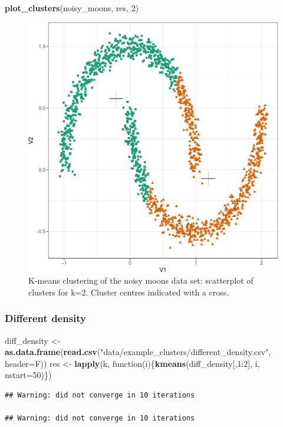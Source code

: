 \documentclass[]{book}
\newenvironment{Shaded}{\begin{snugshade}}{\end{snugshade}}
\newcommand{\KeywordTok}[1]{\textcolor[rgb]{0.13,0.29,0.53}{\textbf{{#1}}}}
\newcommand{\DataTypeTok}[1]{\textcolor[rgb]{0.13,0.29,0.53}{{#1}}}
\newcommand{\DecValTok}[1]{\textcolor[rgb]{0.00,0.00,0.81}{{#1}}}
\newcommand{\StringTok}[1]{\textcolor[rgb]{0.31,0.60,0.02}{{#1}}}
\newcommand{\NormalTok}[1]{{#1}}
\theoremstyle{definition}
\theoremstyle{definition}
\theoremstyle{definition}
\theoremstyle{remark}
\begin{document}
\begin{Shaded}
\begin{Highlighting}[]
\KeywordTok{plot_clusters}\NormalTok{(noisy_moons, res, }\DecValTok{2}\NormalTok{)}
\end{Highlighting}
\end{Shaded}

\begin{figure}

{\centering \includegraphics[width=0.5\linewidth]{09-clustering_files/figure-latex/kmeansNoisyMoonsScatter-1} 

}

\caption{K-means clustering of the noisy moons data set: scatterplot of clusters for k=2. Cluster centres indicated with a cross.}\label{fig:kmeansNoisyMoonsScatter}
\end{figure}

\subsubsection{Different density}\label{different-density}

\begin{Shaded}
\begin{Highlighting}[]
\NormalTok{diff_density <-}\StringTok{ }\KeywordTok{as.data.frame}\NormalTok{(}\KeywordTok{read.csv}\NormalTok{(}\StringTok{"data/example_clusters/different_density.csv"}\NormalTok{, }\DataTypeTok{header=}\NormalTok{F))}
\NormalTok{res <-}\StringTok{ }\KeywordTok{lapply}\NormalTok{(k, function(i)\{}\KeywordTok{kmeans}\NormalTok{(diff_density[,}\DecValTok{1}\NormalTok{:}\DecValTok{2}\NormalTok{], i, }\DataTypeTok{nstart=}\DecValTok{50}\NormalTok{)\})}
\end{Highlighting}
\end{Shaded}

\begin{verbatim}
## Warning: did not converge in 10 iterations

## Warning: did not converge in 10 iterations
\end{verbatim}
\end{document}
